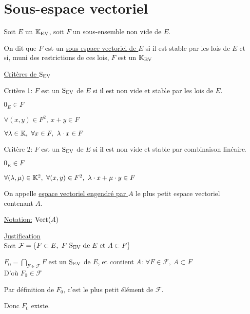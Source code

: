 \documentclass[12pt,twoside,a4paper]{article}
\begin{document}
	\section{Sous-espace vectoriel}
		Soit $E$ un $\mathbb{K}_\text{EV}$, soit $F$ un sous-ensemble non vide de $E$.
		\begin{defi}
			On dit que $F$ est un \underline{sous-espace vectoriel de $E$} si il est stable par les lois de $E$ et si, muni des restrictions de ces lois, $F$ est un $\mathbb{K}_\text{EV}$
		\end{defi}
		\begin{flushleft}
			\underline{Critères de $\mathrm{S}_\mathrm{EV}$}
			\begin{liste}
				\item Critère 1: $F$ est un $\mathrm{S}_\mathrm{EV}$ de $E$ si il est non vide et stable par les lois de $E$.
				\begin{liste}
					\item $0_E\in F$
					\item $\forall(x,y)\in F^{2},\ x+y\in F$
					\item $\forall \lambda\in\K,\ \forall x\in F,\ \lambda\cdot x\in F$
				\end{liste}
				\item Critère 2: $F$ est un $\mathrm{S}_\mathrm{EV}$ de $E$ si il est non vide et stable par combinaison linéaire.
				\begin{liste}
					\item $0_E\in F$
					\item $\forall (\lambda,\mu)\in\mathbb{K}^{2},\ \forall (x,y)\in F^{2},\ \lambda\cdot x+\mu\cdot y\in F$
				\end{liste}
			\end{liste}
		\end{flushleft}
		\begin{defi}
			On appelle \underline{espace vectoriel engendré par $A$} le plus petit espace vectoriel contenant $A$.
		\end{defi}
		\begin{flushleft}
			\underline{Notation:} $\mathrm{Vect}(A)$
		\end{flushleft}
		\begin{flushleft}
			\underline{Justification}\\
			Soit $\mathcal{F}=\left\lbrace F\subset E,\ F\ \Sev\text{ de }E\et A\subset F\right\rbrace $
			\begin{liste}
				\item $F_0=\bigcap\limits_{F\in\mathcal{F}}F$ est un $\mathrm{S}_\mathrm{EV}$ de $E$, et contient $A$: $\forall F\in\mathcal{F},\ A\subset F$\\
					D'o\`u $F_0\in\mathcal{F}$
				\item Par définition de $F_0$, c'est le plus petit élément de $\mathcal{F}$.
			\end{liste}
			Donc $F_0$ existe.
		\end{flushleft}
\end{document}
